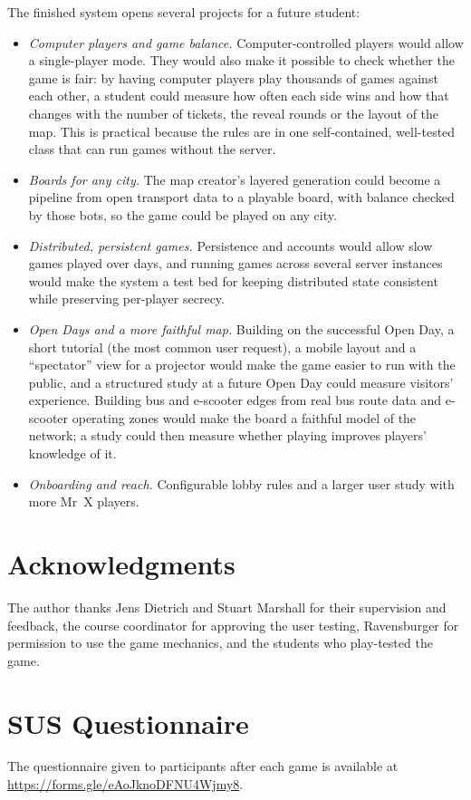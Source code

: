 \documentclass[lettersize,journal]{IEEEtran}
\begin{document}
The finished system opens several projects for a future student:
\begin{itemize}
	\item \emph{Computer players and game balance.} Computer-controlled players would allow a single-player mode. They would also make it possible to check whether the game is fair: by having computer players play thousands of games against each other, a student could measure how often each side wins and how that changes with the number of tickets, the reveal rounds or the layout of the map. This is practical because the rules are in one self-contained, well-tested class that can run games without the server.
	\item \emph{Boards for any city.} The map creator's layered generation could become a pipeline from open transport data to a playable board, with balance checked by those bots, so the game could be played on any city.
	\item \emph{Distributed, persistent games.} Persistence and accounts would allow slow games played over days, and running games across several server instances would make the system a test bed for keeping distributed state consistent while preserving per-player secrecy.
	\item \emph{Open Days and a more faithful map.} Building on the successful Open Day, a short tutorial (the most common user request), a mobile layout and a ``spectator'' view for a projector would make the game easier to run with the public, and a structured study at a future Open Day could measure visitors' experience. Building bus and e-scooter edges from real bus route data and e-scooter operating zones would make the board a faithful model of the network; a study could then measure whether playing improves players' knowledge of it.
	\item \emph{Onboarding and reach.} Configurable lobby rules and a larger user study with more Mr~X players.
\end{itemize}

\section*{Acknowledgments}
The author thanks Jens Dietrich and Stuart Marshall for their supervision and feedback, the course coordinator for approving the user testing, Ravensburger for permission to use the game mechanics, and the students who play-tested the game.





\appendices
\section{SUS Questionnaire}\label{app:sus}
The questionnaire given to participants after each game is available at \url{https://forms.gle/eAoJknoDFNU4Wjmy8}.
\end{document}
